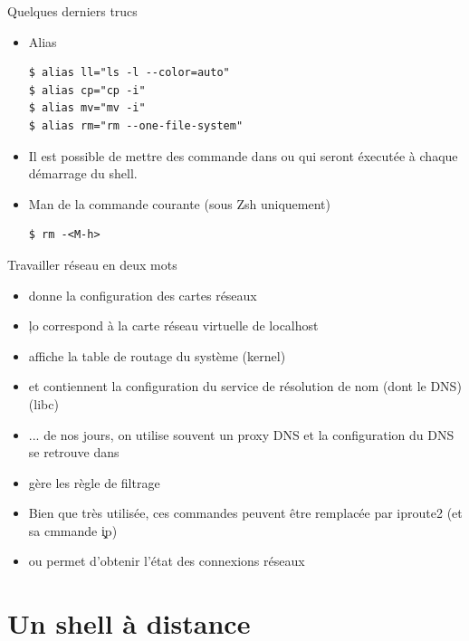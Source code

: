 \begin{frame}[fragile=singleslide]{Quelques derniers trucs}
  \begin{itemize}
  \item Alias
    \begin{lstlisting}
$ alias ll="ls -l --color=auto"
$ alias cp="cp -i"
$ alias mv="mv -i"
$ alias rm="rm --one-file-system"
    \end{lstlisting} %
  \item Il est possible  de mettre des commande dans 
    ou   qui  seront  éxecutée à  chaque démarrage  du
    shell.
  \item Man de la commande courante (sous Zsh uniquement)
    \begin{lstlisting}
$ rm -<M-h>
    \end{lstlisting} %
  \end{itemize}
\end{frame}

\begin{frame}[fragile=singleslide]{Travailler réseau en deux mots}
  \begin{itemize}
  \item  {} donne  la  configuration des  cartes
    réseaux
  \item \c{lo} correspond à la carte réseau virtuelle de localhost
  \item {} affiche la table de routage du système (kernel)
  \item     {}    et    
    contiennent la configuration du service de résolution de nom (dont
    le DNS) (libc)
  \item  ... de  nos jours,  on  utilise souvent  un proxy  DNS et  la
    configuration       du       DNS       se      retrouve       dans
  \item {} gère les règle de filtrage
  \item Bien  que très utilisée, ces commandes  peuvent être remplacée
    par iproute2 (et sa cmmande \c{ip})
  \item {} ou   permet d'obtenir l'état
    des connexions réseaux
  \end{itemize}
\end{frame}

\section{Un shell à distance}

